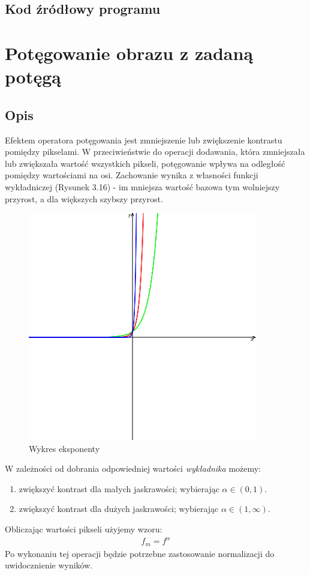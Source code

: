 \documentclass[a4paper,12pt]{book}
\begin{document}
\subsection{Kod źródłowy programu}

\section{Potęgowanie obrazu z zadaną potęgą}
\subsection{Opis}
Efektem operatora potęgowania jest zmniejszenie lub zwiększenie kontrastu pomiędzy pikselami. W przeciwieństwie do operacji dodawania, która zmniejszała lub zwiększała wartość wszystkich pikseli, potęgowanie wpływa na odległość pomiędzy wartościami na osi. Zachowanie wynika z własności funkcji wykładniczej (Rysunek 3.16) - im mniejsza wartość bazowa tym wolniejszy przyrost, a dla większych szybszy przyrost. 
\begin{figure}[H]
	\caption{Wykres eksponenty}
	\includegraphics[width=10cm, height=10cm]{overview/exponential-curve.png}
\end{figure}
W zależności od dobrania odpowiedniej wartości \textit{wykładnika} możemy: 
\begin{enumerate}
	\item zwiększyć kontrast dla małych jaskrawości; wybierając $\alpha \in (0,1)$. 
	\item zwiększyć kontrast dla dużych jaskrawości; wybierając $\alpha \in (1,\infty)$. 
\end{enumerate}
Obliczając wartości pikseli użyjemy wzoru: 
\begin{gather}
	f_m = f^\alpha
\end{gather}
Po wykonaniu tej operacji będzie potrzebne zastosowanie normalizacji do uwidocznienie wyników. 
\end{document}
